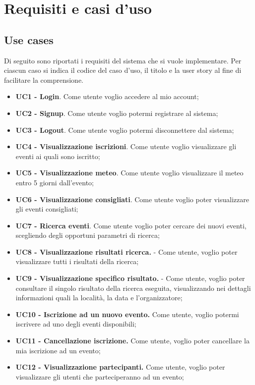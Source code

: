 \section{Requisiti e casi d'uso}

\subsection{Use cases}
Di seguito sono riportati i requisiti del sistema che si vuole implementare. Per ciascun caso si indica
il codice del caso d'uso, il titolo e la user story al fine di facilitare la comprensione.

\begin{itemize}
    \item \textbf{UC1 - Login}. Come utente voglio accedere al mio account;
    \item \textbf{UC2 - Signup}. Come utente voglio potermi registrare al sistema;
    \item \textbf{UC3 - Logout}. Come utente voglio potermi disconnettere dal sistema;
    \item \textbf{UC4 - Visualizzazione iscrizioni}. Come utente voglio visualizzare gli eventi ai quali sono iscritto;
    \item \textbf{UC5 - Visualizzazione meteo}. Come utente voglio visualizzare il meteo entro 5 giorni dall’evento;
    \item \textbf{UC6 - Visualizzazione consigliati}. Come utente voglio poter visualizzare gli eventi consigliati;
    \item \textbf{UC7 - Ricerca eventi}. Come utente voglio poter cercare dei nuovi eventi, scegliendo degli opportuni parametri di ricerca;
    \item \textbf{UC8 - Visualizzazione risultati ricerca.} - Come utente, voglio poter visualizzare tutti i risultati della ricerca;
    \item \textbf{UC9 - Visualizzazione specifico risultato.} - Come utente, voglio poter consultare il singolo risultato della ricerca eseguita, visualizzando nei dettagli informazioni quali la località, la data e l’organizzatore;
    \item \textbf{UC10 - Iscrizione ad un nuovo evento.} Come utente, voglio potermi iscrivere ad uno degli eventi disponibili;
    \item \textbf{UC11 - Cancellazione iscrizione.} Come utente, voglio poter cancellare la mia iscrizione ad un evento;
    \item \textbf{UC12 - Visualizzazione partecipanti.} Come utente, voglio poter visualizzare gli utenti che parteciperanno ad un evento;

\end{itemize}
